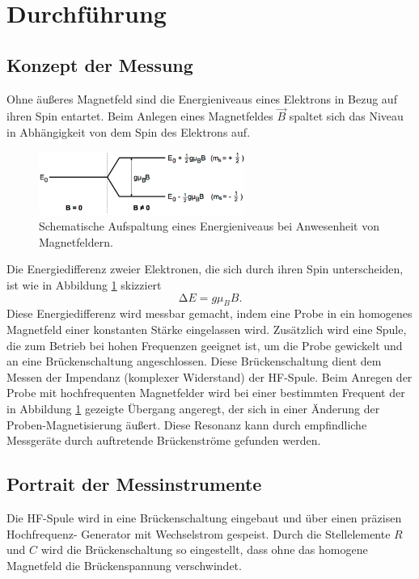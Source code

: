 \section{Durchführung}
\label{sec:Durchführung}
\subsection{Konzept der Messung}
\label{sec:Durchführung1}

Ohne äußeres Magnetfeld sind die Energieniveaus eines Elektrons in Bezug auf
ihren Spin entartet.
Beim Anlegen eines Magnetfeldes $\vec{B}$ spaltet sich das Niveau in Abhängigkeit
von dem Spin des Elektrons auf.
\begin{figure}
  \centering
  \includegraphics[width=0.6\textwidth]{graphics/energieaufspaltung.png}
  \caption{Schematische Aufspaltung eines Energieniveaus bei Anwesenheit von Magnetfeldern.\cite{skript}}
  \label{fig:energieaufspaltung}
\end{figure}
Die Energiedifferenz zweier Elektronen, die sich durch ihren Spin unterscheiden,
ist wie in Abbildung \ref{fig:energieaufspaltung} skizziert
\begin{equation}
  \mathup\Delta E = g\mu_B B.
\end{equation}
Diese Energiedifferenz wird messbar gemacht, indem eine Probe in ein homogenes
Magnetfeld einer konstanten Stärke eingelassen wird. Zusätzlich wird eine Spule,
die zum Betrieb bei hohen Frequenzen geeignet ist, um die Probe gewickelt und an
eine Brückenschaltung angeschlossen. Diese Brückenschaltung dient dem Messen der
Impendanz (komplexer Widerstand) der HF-Spule. Beim Anregen der Probe mit
hochfrequenten Magnetfelder wird bei einer bestimmten Frequent der in Abbildung
\ref{fig:energieaufspaltung} gezeigte Übergang angeregt, der sich in einer Änderung
der Proben-Magnetisierung äußert.
Diese Resonanz kann durch empfindliche Messgeräte durch auftretende Brückenströme
gefunden werden.

\subsection{Portrait der Messinstrumente}
Die HF-Spule wird in eine Brückenschaltung eingebaut und über einen präzisen Hochfrequenz-
Generator mit Wechselstrom gespeist. Durch die Stellelemente $R$ und $C$ wird die
Brückenschaltung so eingestellt, dass ohne das homogene Magnetfeld die Brückenspannung
verschwindet.

